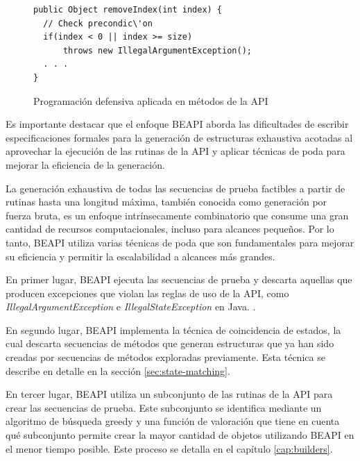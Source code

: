 \begin{figure}[!thb]
\begin{lstlisting}
public Object removeIndex(int index) {
  // Check precondic\'on
  if(index < 0 || index >= size)
      throws new IllegalArgumentException();  
  . . .
}

\end{lstlisting}
\caption{Programación defensiva aplicada en métodos de la API}
\label{fig:algoProgDefensiva}
\end{figure}


Es importante destacar que el enfoque \textsf{BEAPI} aborda las dificultades de escribir especificaciones formales para la generación de estructuras exhaustiva acotadas al aprovechar la ejecución de las rutinas de la API y aplicar técnicas de poda para mejorar la eficiencia de la generación.

 La generación exhaustiva de todas las secuencias de prueba factibles a partir de rutinas hasta una longitud máxima, también conocida como generación por fuerza bruta, es un enfoque intrínsecamente combinatorio que consume una gran cantidad de recursos computacionales, incluso para alcances pequeños. Por lo tanto, \textsf{BEAPI} utiliza varias técnicas de poda que son fundamentales para mejorar su eficiencia y permitir la escalabilidad a alcances más grandes.

En primer lugar, \textsf{BEAPI} ejecuta las secuencias de prueba y descarta
aquellas que producen excepciones que violan las reglas de uso de la API, como
\emph{IllegalArgumentException} e \emph{IllegalStateException} en Java.
.

En segundo lugar, \textsf{BEAPI} implementa la técnica de coincidencia de estados, la cual descarta secuencias de métodos que generan estructuras que ya han sido creadas por secuencias de métodos exploradas previamente. Esta técnica se describe en detalle en la sección \ref{sec:state-matching}.

En tercer lugar, \textsf{BEAPI} utiliza un subconjunto de las rutinas de la API para crear las secuencias de prueba.
Este subconjunto se identifica mediante un algoritmo de búsqueda greedy y una función de valoración que tiene en cuenta qué subconjunto permite crear la mayor cantidad de objetos utilizando \textsf{BEAPI} en el menor tiempo posible. Este proceso se detalla en el capítulo \ref{cap:builders}.

